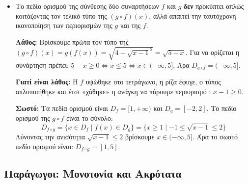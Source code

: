 \begin{itemize}[label=\textcolor{red!80!black}{\faExclamationTriangle},itemindent=7mm,leftmargin=0mm]
\item {}

Το πεδίο ορισμού της σύνθεσης δύο συναρτήσεων $f$ και $g$ \textbf{δεν} προκύπτει απλώς κοιτάζοντας τον τελικό τύπο της $(g \circ f)(x)$, αλλά απαιτεί την ταυτόχρονη ικανοποίηση των περιορισμών της $g$ και της $f$.


\lysh
\textbf{Λάθος:} 
Βρίσκουμε πρώτα τον τύπο της $(g \circ f)(x) = g(f(x)) = \sqrt{4-\sqrt{x-1}^2}=\sqrt{5-x}$. 
Για να ορίζεται η συνάρτηση πρέπει: $5-x \ge 0 \Leftrightarrow x\leq 5\Leftrightarrow x \in (-\infty,5]$.
Άρα $D_{g \circ f} = (-\infty,5]$.

\textbf{Γιατί είναι λάθος:} Η $f$ υψώθηκε στο τετράγωνο, η ρίζα έφυγε, ο τύπος απλοποιήθηκε και έτσι «χάθηκε» η ανάγκη να πάρουμε περιορισμό : $x-1\geq 0$.

\textbf{Σωστό:}
Τα πεδία ορισμού είναι $D_f = [1, +\infty)$ και $D_g = [-2,2]$.
Το πεδίο ορισμού της $g \circ f$ είναι το σύνολο:
\[ D_{f \circ g} = \{x \in D_f \mid f(x) \in D_g\} = \{x\geq 1 \mid -1\leq\sqrt{x-1}\leq 2\} \]
Λύνοντας την ανισότητα $\sqrt{x-1}\leq 2$ βρίσκουμε $x \in (-\infty, 5]$. Άρα το σωστό πεδίο ορισμού είναι: $D_{f \circ g} = [1, 5]$.
\end{itemize}

\subsection{Παράγωγοι: Μονοτονία και Ακρότατα}


